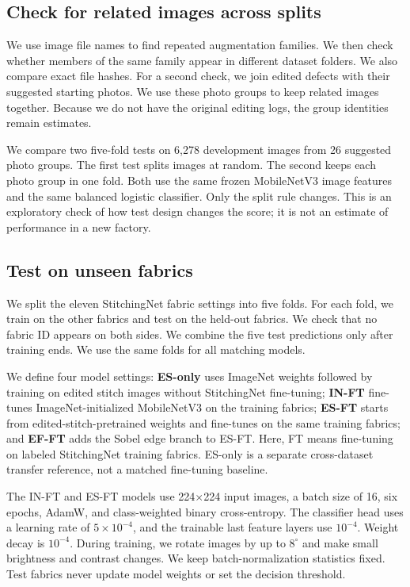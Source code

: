 \documentclass[conference,a4paper]{IEEEtran}
\begin{document}
\subsection{Check for related images across splits}
We use image file names to find repeated augmentation families. We then check whether members of the same family appear in different dataset folders. We also compare exact file hashes. For a second check, we join edited defects with their suggested starting photos. We use these photo groups to keep related images together. Because we do not have the original editing logs, the group identities remain estimates.

We compare two five-fold tests on 6,278 development images from 26 suggested photo groups. The first test splits images at random. The second keeps each photo group in one fold. Both use the same frozen MobileNetV3 image features and the same balanced logistic classifier. Only the split rule changes. This is an exploratory check of how test design changes the score; it is not an estimate of performance in a new factory.

\subsection{Test on unseen fabrics}
We split the eleven StitchingNet fabric settings into five folds. For each fold, we train on the other fabrics and test on the held-out fabrics. We check that no fabric ID appears on both sides. We combine the five test predictions only after training ends. We use the same folds for all matching models.

We define four model settings: \textbf{ES-only} uses ImageNet weights followed by training on edited stitch images without StitchingNet fine-tuning; \textbf{IN-FT} fine-tunes ImageNet-initialized MobileNetV3 on the training fabrics; \textbf{ES-FT} starts from edited-stitch-pretrained weights and fine-tunes on the same training fabrics; and \textbf{EF-FT} adds the Sobel edge branch to ES-FT. Here, FT means fine-tuning on labeled StitchingNet training fabrics. ES-only is a separate cross-dataset transfer reference, not a matched fine-tuning baseline.

The IN-FT and ES-FT models use 224$\times$224 input images, a batch size of 16, six epochs, AdamW, and class-weighted binary cross-entropy. The classifier head uses a learning rate of $5\times10^{-4}$, and the trainable last feature layers use $10^{-4}$. Weight decay is $10^{-4}$. During training, we rotate images by up to $8^{\circ}$ and make small brightness and contrast changes. We keep batch-normalization statistics fixed. Test fabrics never update model weights or set the decision threshold.
\end{document}
